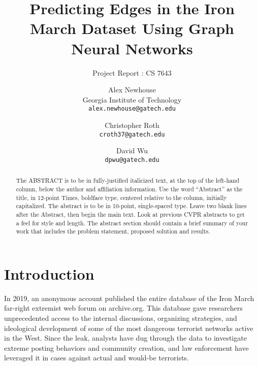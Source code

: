 \documentclass[10pt,twocolumn,letterpaper]{article}
\begin{document}
\title{Predicting Edges in the Iron March Dataset Using Graph Neural Networks}
\subtitle{Project Report : CS 7643}

\author{Alex Newhouse\\
Georgia Institute of Technology\\
{\tt\small alex.newhouse@gatech.edu}
\and
Christopher Roth\\
{\tt\small croth37@gatech.edu}
\and
David Wu\\
{\tt\small dpwu@gatech.edu}
}

\maketitle

\begin{abstract}
   The ABSTRACT is to be in fully-justified italicized text, at the top
   of the left-hand column, below the author and affiliation
   information. Use the word ``Abstract'' as the title, in 12-point
   Times, boldface type, centered relative to the column, initially
   capitalized. The abstract is to be in 10-point, single-spaced type.
   Leave two blank lines after the Abstract, then begin the main text.
   Look at previous CVPR abstracts to get a feel for style and length. 
   The abstract section should contain a brief summary of your work that
   includes the problem statement, proposed solution and results.
\end{abstract}

\section{Introduction}

In 2019, an anonymous account published the entire database of the Iron March far-right extremist web forum on archive.org. This database gave researchers unprecedented access to the internal discussions, organizing strategies, and ideological  development of some of the most dangerous terrorist networks active in the West. Since the leak, analysts have dug through the data to investigate extreme posting behaviors and community creation, and law enforcement have leveraged it in cases against actual and would-be terrorists. 
\end{document}
